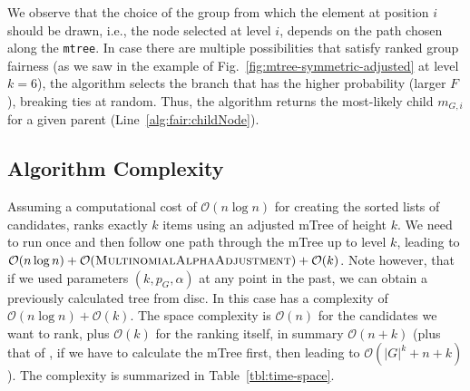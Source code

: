 We observe that the
choice of the group from which the element at position $i$ should be drawn, i.e., the node selected at level $i$, depends on the path chosen along the \texttt{mtree}. %
%
In case there are multiple possibilities that satisfy ranked group fairness (as we saw in the example of Fig.~\ref{fig:mtree-symmetric-adjusted} at level $k=6$), the algorithm selects the branch that has the higher probability (larger $F$), breaking ties at random.
%
%
Thus, the algorithm returns the most-likely child $m_{G,i}$ for a given parent (Line~\ref{alg:fair:childNode}).
%


\subsection{Algorithm Complexity}\label{subsec:FAIR-complexity}
Assuming a computational cost of $\mathcal{O}(n \log{} n)$ for creating the sorted lists of candidates, \algoFAIR ranks exactly $k$ items using an adjusted mTree of height $k$.
%
We need to run \algoMultBinary once and then follow one path through the mTree up to level $k$, leading to $\mathcal{O}(n \log{} n) + \mathcal{O} (\text{{\sc MultinomialAlphaAdjustment}}) + \mathcal{O}(k)$.
%
Note however, that if we used parameters $(k, p_G, \alpha)$ at any point in the past, we can obtain a previously calculated tree from disc.
%
In this case \algoFAIR has a complexity of $\mathcal{O}(n \log{} n) + \mathcal{O}(k)$.
%
The space complexity is $\mathcal{O}(n)$ for the candidates we want to rank, plus $\mathcal{O}(k)$ for the ranking itself, in summary $\mathcal{O}(n + k)$ (plus that of \algoMultBinary, if we have to calculate the mTree first, then leading to $\mathcal{O}(|G|^k + n + k)$).
%
The complexity is summarized in Table~\ref{tbl:time-space}.
%

